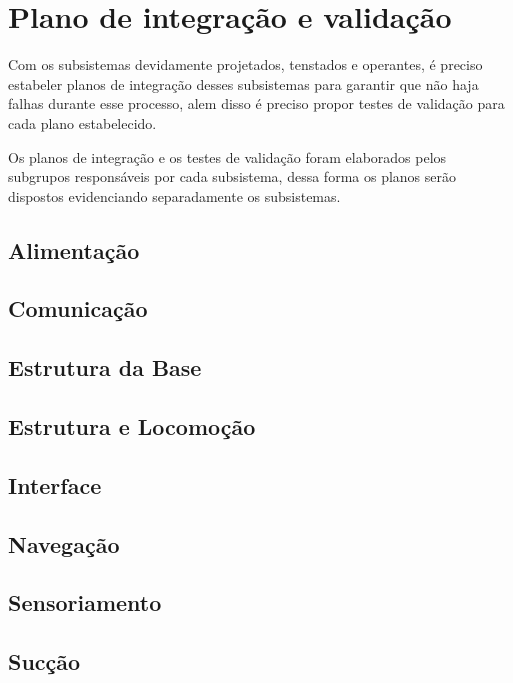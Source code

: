 \section{Plano de integração e validação} %
\label{sec:plano_de_integração_e_validação}
	Com os subsistemas devidamente projetados, tenstados e operantes, é preciso estabeler planos de integração desses subsistemas para garantir que não haja falhas durante esse processo, alem disso é preciso propor testes de validação para cada plano estabelecido.

	Os planos de integração e os testes de validação foram elaborados pelos subgrupos responsáveis por cada subsistema, dessa forma os planos serão dispostos evidenciando separadamente os subsistemas.

	\subsection{Alimentação}
	\label{sub:plano_alimentação}

	\subsection{Comunicação}
	\label{sub:plano_comunicação}

	\subsection{Estrutura da Base}
	\label{sub:plano_estrutura}

	\subsection{Estrutura e Locomoção}
	\label{sub:plano_locomoção}

	\subsection{Interface}
	\label{sub:plano_interface}

	\subsection{Navegação}
	\label{sub:plano_navegação}

	\subsection{Sensoriamento}
	\label{sub:plano_sensoriamento}

	\subsection{Sucção}
	\label{sub:plano_sucção}


